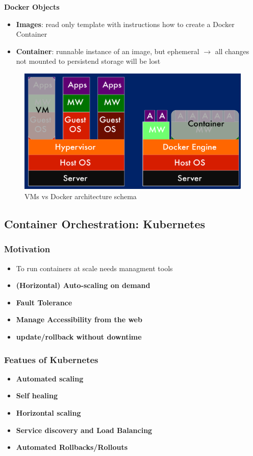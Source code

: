 \documentclass[a4paper]{article}
\begin{document}
\begin{multicols}{3}
\textbf{Docker Objects}
\begin{itemize}
    \item \textbf{Images}: read only template with instructions how to create a Docker Container
    \item \textbf{Container}: runnable instance of an  image, but ephemeral $\rightarrow$ all changes not mounted to persistend storage will be lost
\end{itemize}

\begin{figure}[H]
    \includegraphics[width=\linewidth]{vmvsdocker.png}
    \caption{VMs vs Docker architecture schema}
    \label{fig:vmvsdocker}
\end{figure}

\subsection*{Container Orchestration: Kubernetes}

\subsubsection*{Motivation}
\begin{itemize}
    \item To run containers at scale needs managment tools
    \item \textbf{(Horizontal) Auto-scaling on demand}
    \item \textbf{Fault Tolerance}
    \item \textbf{Manage Accessibility from the web}
    \item \textbf{update/rollback without downtime}
\end{itemize}

\subsubsection*{Featues of Kubernetes}
\begin{itemize}
    \item \textbf{Automated scaling}
    \item \textbf{Self healing}
    \item \textbf{Horizontal scaling}
    \item \textbf{Service discovery and Load Balancing}
    \item \textbf{Automated Rollbacks/Rollouts}
\end{itemize}


\end{multicols}
\end{document}

